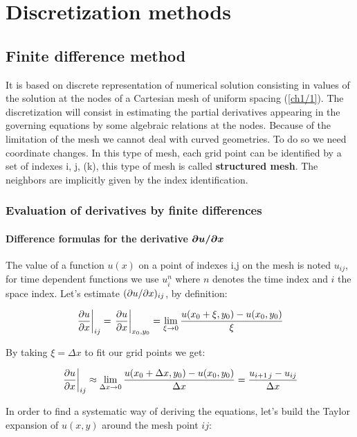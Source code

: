 
\chapter{Discretization methods}
\section{Finite difference method}
It is based on discrete representation of numerical solution consisting in values of the solution at the nodes of a Cartesian mesh of uniform spacing (\autoref{ch1/1}). The discretization will consist in estimating the partial derivatives appearing in the governing equations by some algebraic relations at the nodes. Because of the limitation of the mesh we cannot deal with curved geometries. To do so we need coordinate changes. In this type of mesh, each grid point can be identified by a set of indexes i, j, (k), this type of mesh is called \textbf{structured mesh}. The neighbors are implicitly given by the index identification. 

\subsection{Evaluation of derivatives by finite differences}
\subsubsection{Difference formulas for the derivative $\bm{\partial u / \partial x}$}
The value of a function $u(x)$ on a point of indexes i,j on the mesh is noted $u_{ij}$, for time dependent functions we use $u^n_i$ where $n$ denotes the time index and $i$ the space index. Let's estimate $(\partial u / \partial x)_{ij}$, by definition: 

\begin{equation}
\left.\frac{\partial u }{\partial x}\right| _{ij} = \left.\frac{\partial u }{\partial x}\right| _{x_0,y_0}= \lim _{\xi \rightarrow 0} \frac{u(x_0+\xi, y_0) - u(x_0,y_0)}{\xi}  
\end{equation}

By taking $\xi = \Delta x$ to fit our grid points we get: 

\begin{equation}
\left.\frac{\partial u }{\partial x}\right| _{ij} \approx \lim _{\Delta x \rightarrow 0} \frac{u(x_0+\Delta x, y_0) - u(x_0,y_0)}{\Delta x}= \frac{u_{i+1\, j} - u_{ij}}{\Delta x}  
\end{equation}

In order to find a systematic way of deriving the equations, let's build the Taylor expansion of $u(x,y)$ around the mesh point $ij$: 

